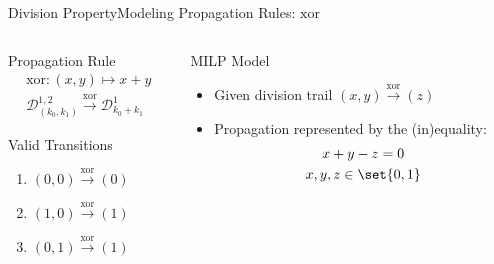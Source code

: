 \begin{frame}{Division Property}{Modeling Propagation Rules: $\mathrm{xor}$}
    \begin{columns}
        \begin{column}{0.35\textwidth}
            \begin{block}{Propagation Rule}
            \vspace*{-10pt}
            \begin{gather*}
                \mathrm{xor} : (x,y) \mapsto x + y \\
                \mathcal{D}^{1,2}_{(k_0,k_1)} \stackrel{\mathrm{xor}}{\to} \mathcal{D}^1_{k_0+k_1}
            \end{gather*}
            \end{block}
            \begin{block}{Valid Transitions}
                \begin{enumerate}
                    \item \quad $(0,0) \stackrel{\mathrm{xor}}{\to} (0)$
                    \item \quad $(1,0) \stackrel{\mathrm{xor}}{\to} (1)$
                    \item \quad $(0,1) \stackrel{\mathrm{xor}}{\to} (1)$
                \end{enumerate}
            \end{block}
            \pause
        \end{column}
        \begin{column}{0.575\textwidth}
            \begin{block}{MILP Model}
            \begin{itemize}
                \item Given division trail $(x, y) \stackrel{\mathrm{xor}}{\to} (z)$\\[2pt]
                \item Propagation represented by the (in)equality:
                    \begin{gather*}
                        x + y - z = 0\\
                        x, y, z \in \set{0,1}
                    \end{gather*}
            \end{itemize}
            \end{block}
        \end{column}
    \end{columns}
\end{frame}

